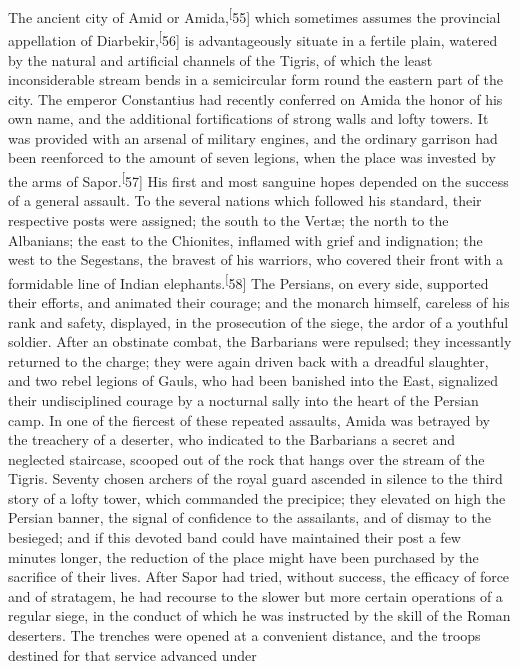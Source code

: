 The ancient city of Amid or Amida,\textsuperscript[55] which sometimes assumes the
provincial appellation of Diarbekir,\textsuperscript[56] is advantageously situate
in a fertile plain, watered by the natural and artificial
channels of the Tigris, of which the least inconsiderable stream
bends in a semicircular form round the eastern part of the city.
The emperor Constantius had recently conferred on Amida the honor
of his own name, and the additional fortifications of strong
walls and lofty towers. It was provided with an arsenal of
military engines, and the ordinary garrison had been reenforced
to the amount of seven legions, when the place was invested by
the arms of Sapor.\textsuperscript[57] His first and most sanguine hopes depended
on the success of a general assault. To the several nations which
followed his standard, their respective posts were assigned; the
south to the Vertæ; the north to the Albanians; the east to the
Chionites, inflamed with grief and indignation; the west to the
Segestans, the bravest of his warriors, who covered their front
with a formidable line of Indian elephants.\textsuperscript[58] The Persians, on
every side, supported their efforts, and animated their courage;
and the monarch himself, careless of his rank and safety,
displayed, in the prosecution of the siege, the ardor of a
youthful soldier. After an obstinate combat, the Barbarians were
repulsed; they incessantly returned to the charge; they were
again driven back with a dreadful slaughter, and two rebel
legions of Gauls, who had been banished into the East, signalized
their undisciplined courage by a nocturnal sally into the heart
of the Persian camp. In one of the fiercest of these repeated
assaults, Amida was betrayed by the treachery of a deserter, who
indicated to the Barbarians a secret and neglected staircase,
scooped out of the rock that hangs over the stream of the Tigris.
Seventy chosen archers of the royal guard ascended in silence to
the third story of a lofty tower, which commanded the precipice;
they elevated on high the Persian banner, the signal of
confidence to the assailants, and of dismay to the besieged; and
if this devoted band could have maintained their post a few
minutes longer, the reduction of the place might have been
purchased by the sacrifice of their lives. After Sapor had tried,
without success, the efficacy of force and of stratagem, he had
recourse to the slower but more certain operations of a regular
siege, in the conduct of which he was instructed by the skill of
the Roman deserters. The trenches were opened at a convenient
distance, and the troops destined for that service advanced under
